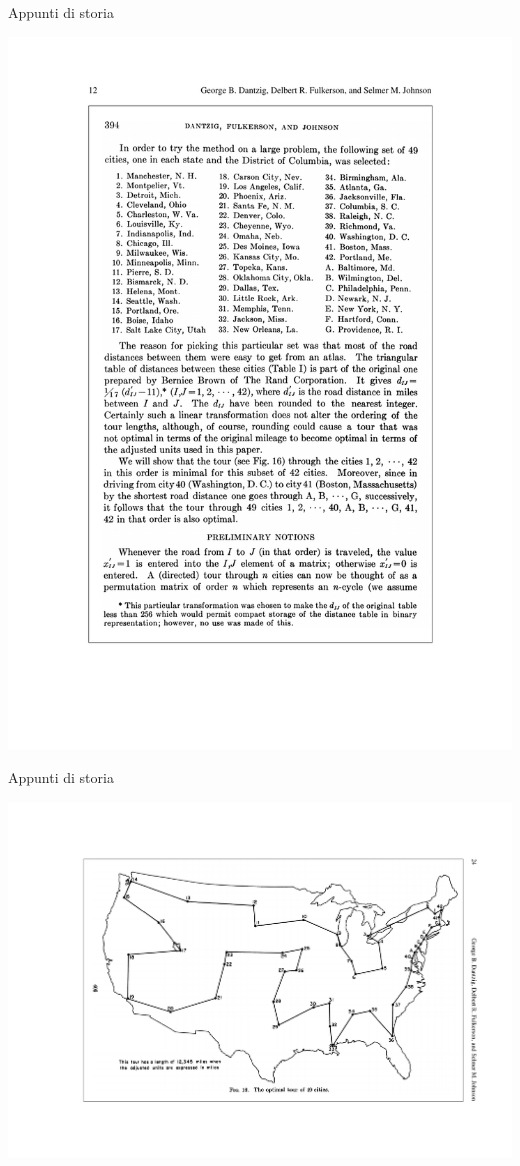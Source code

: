 \begin{OnlySlides}{Appunti di storia}
    
\includegraphics[width=\textwidth]{dantzig-3.pdf}

\end{OnlySlides}

\begin{OnlySlides}{Appunti di storia}
    
\includegraphics[width=\textwidth]{dantzig-4.pdf}

\end{OnlySlides}

